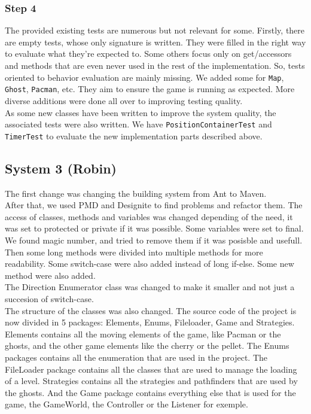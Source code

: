 \documentclass[]{article}
\begin{document}
\subsubsection{Step 4}

\indent \par The provided existing tests are numerous but not relevant for some. Firstly, there are empty tests, whose only signature is written. They were filled in the right way to evaluate what they're expected to. Some others focus only on get/accessors and methods that are even never used in the rest of the implementation. So, tests oriented to behavior evaluation are mainly missing. We added some for \texttt{Map}, \texttt{Ghost}, \texttt{Pacman}, etc. They aim to ensure the game is running as expected. More diverse additions were done all over to improving testing quality.\\

As some new classes have been written to improve the system quality, the associated tests were also written. We have \texttt{PositionContainerTest} and \texttt{TimerTest} to evaluate the new implementation parts described above.

\newpage
\subsection{System 3 (Robin)}

The first change was changing the building system from Ant to Maven. 
\\

After that, we used PMD and Designite to find problems and refactor them. The access of classes, methods and variables was changed depending of the need, it was set to protected or private if it was possible. Some variables were set to final. We found magic number, and tried to remove them if it was posisble and usefull. 
\\

Then some long methods were divided into multiple methods for more readability. Some switch-case were also added instead of long if-else. Some new method were also added.
\\

The Direction Enumerator class was changed to make it smaller and not just a succesion of switch-case. 
\\

The structure of the classes was also changed. The source code of the project is now divided in 5 packages: Elements, Enums, Fileloader, Game and Strategies. Elements contains all the moving elements of the game, like Pacman or the ghosts, and the other game elements like the cherry or the pellet. The Enums packages contains all the enumeration that are used in the project. The FileLoader package contains all the classes that are used to manage the loading of a level. Strategies contains all the strategies and pathfinders that are used by the ghosts. And the Game package contains everything else that is used for the game, the GameWorld, the Controller or the Listener for exemple.
\\
\end{document}
